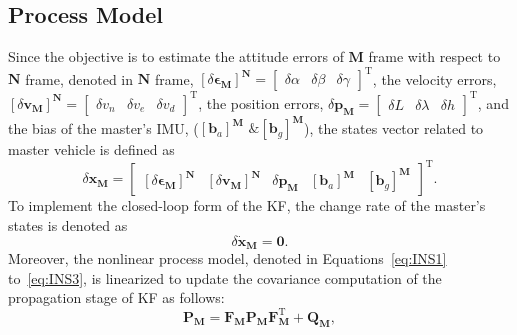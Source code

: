 \documentclass[3p]{elsarticle}
\begin{document}













\subsection{Process Model}
\noindent Since the objective is to estimate the attitude errors of \({\mathbf{M}}\) frame with respect to \({\mathbf{N}}\) frame, denoted in \({\mathbf{N}}\) frame, \({\left[\delta \boldsymbol{\epsilon}_{\mathbf{M}}\right]}^{\mathbf{N}} = \begin{bmatrix}
	\delta \alpha & \delta \beta & \delta \gamma
\end{bmatrix}^{\mathrm{T}}\), the velocity errors, \({\left[\delta \mathbf{v}_{\mathbf{M}}\right]}^{\mathbf{N}} = \begin{bmatrix}
	\delta v_n & \delta v_e & \delta v_d\end{bmatrix}^{\mathrm{T}}\), the position errors, \(\delta \mathbf{p}_{\mathbf{M}} = \begin{bmatrix}\delta L & \delta \lambda & \delta h\end{bmatrix}^{\mathrm{T}}\), and the bias of the master's IMU, (\({\left[\mathbf{b}_{a}\right]}^{\mathbf{M}} \text{ \& } {\left[\mathbf{b}_{g}\right]}^{\mathbf{M}}\)), the states vector related to master vehicle
	 is defined as
\begin{equation}
	\delta \mathbf{x}_{\mathbf{M}} = \begin{bmatrix}
		{\left[\delta \boldsymbol{\epsilon}_{\mathbf{M}}\right]}^{\mathbf{N}} & {\left[\delta \mathbf{v}_{\mathbf{M}}\right]}^{\mathbf{N}} & \delta \mathbf{p}_{\mathbf{M}} & {\left[\mathbf{b}_{a}\right]}^{\mathbf{M}} & {\left[\mathbf{b}_{g}\right]}^{\mathbf{M}}
	\end{bmatrix}^{\mathrm{T}}.
\end{equation}
To implement the closed-loop form of the KF, the change rate of the master's states is denoted as
\begin{equation*}
	\delta \dot{\mathbf{x}}_{\mathbf{M}} = \mathbf{0}.
\end{equation*}
Moreover, the nonlinear process model, denoted in Equations~\eqref{eq:INS1} to~\eqref{eq:INS3}, is linearized to update the covariance computation of the propagation stage of KF as follows:
\begin{equation}
	\mathbf{P}_{\mathbf{M}} = \mathbf{F}_{\mathbf{M}} \mathbf{P}_{\mathbf{M}} \mathbf{F}_{\mathbf{M}}^{\mathrm{T}} +  \mathbf{Q}_{\mathbf{M}},
\end{equation}
\end{document}

